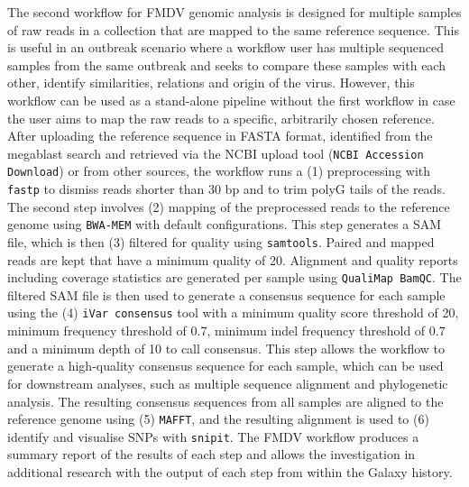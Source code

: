 The second workflow for \ac{FMDV} genomic analysis is designed for multiple samples of raw reads in a collection that are mapped to the same reference sequence. This is useful in an outbreak scenario where a workflow user has multiple sequenced samples from the same outbreak and seeks to compare these samples with each other, identify similarities, relations and origin of the virus. However, this workflow can be used as a stand-alone pipeline without the first workflow in case the user aims to map the raw reads to a specific, arbitrarily chosen reference. After uploading the reference sequence in FASTA format, identified from the megablast search and retrieved via the \ac{NCBI} upload tool (\texttt{NCBI Accession Download}) or from other sources, the workflow runs a (1) preprocessing with \texttt{fastp} to dismiss reads shorter than 30 bp and to trim polyG tails of the reads. The second step involves (2) mapping of the preprocessed reads to the reference genome using \texttt{BWA-MEM} with default configurations. This step generates a \ac{SAM} file, which is then (3) filtered for quality using \texttt{samtools}. Paired and mapped reads are kept that have a minimum quality of 20. Alignment and quality reports including coverage statistics are generated per sample using \texttt{QualiMap BamQC}. The filtered \ac{SAM} file is then used to generate a consensus sequence for each sample using the (4) \texttt{iVar consensus} tool with a minimum quality score threshold of 20, minimum frequency threshold of 0.7, minimum indel frequency threshold of 0.7 and a minimum depth of 10 to call consensus. This step allows the workflow to generate a high-quality consensus sequence for each sample, which can be used for downstream analyses, such as multiple sequence alignment and phylogenetic analysis. The resulting consensus sequences from all samples are aligned to the reference genome using (5) \texttt{\acs{MAFFT}}, and the resulting alignment is used to (6) identify and visualise \acs{SNP}s with \texttt{snipit}. The \ac{FMDV} workflow produces a summary report of the results of each step and allows the investigation in additional research with the output of each step from within the Galaxy history. 
